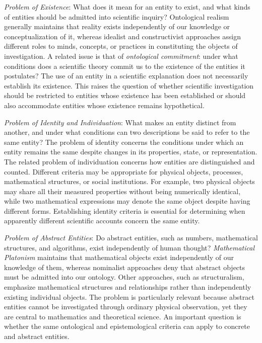 \emph{Problem of Existence}: What does it mean for an entity to exist, and what kinds of entities should be admitted into scientific inquiry? Ontological realism generally maintains that reality exists independently of our knowledge or conceptualization of it, whereas idealist and constructivist approaches assign different roles to minds, concepts, or practices in constituting the objects of investigation. A related issue is that of \emph{ontological commitment}: under what conditions does a scientific theory commit us to the existence of the entities it postulates? The use of an entity in a scientific explanation does not necessarily establish its existence. This raises the question of whether scientific investigation should be restricted to entities whose existence has been established or should also accommodate entities whose existence remains hypothetical.

\emph{Problem of Identity and Individuation}: What makes an entity distinct from another, and under what conditions can two descriptions be said to refer to the same entity? The problem of identity concerns the conditions under which an entity remains the same despite changes in its properties, state, or representation. The related problem of individuation concerns how entities are distinguished and counted. Different criteria may be appropriate for physical objects, processes, mathematical structures, or social institutions. For example, two physical objects may share all their measured properties without being numerically identical, while two mathematical expressions may denote the same object despite having different forms. Establishing identity criteria is essential for determining when apparently different scientific accounts concern the same entity.

\emph{Problem of Abstract Entities}: Do abstract entities, such as numbers, mathematical structures, and algorithms, exist independently of human thought? \emph{Mathematical Platonism} maintains that mathematical objects exist independently of our knowledge of them, whereas nominalist approaches deny that abstract objects must be admitted into our ontology. Other approaches, such as structuralism, emphasize mathematical structures and relationships rather than independently existing individual objects. The problem is particularly relevant because abstract entities cannot be investigated through ordinary physical observation, yet they are central to mathematics and theoretical science. An important question is whether the same ontological and epistemological criteria can apply to concrete and abstract entities.

